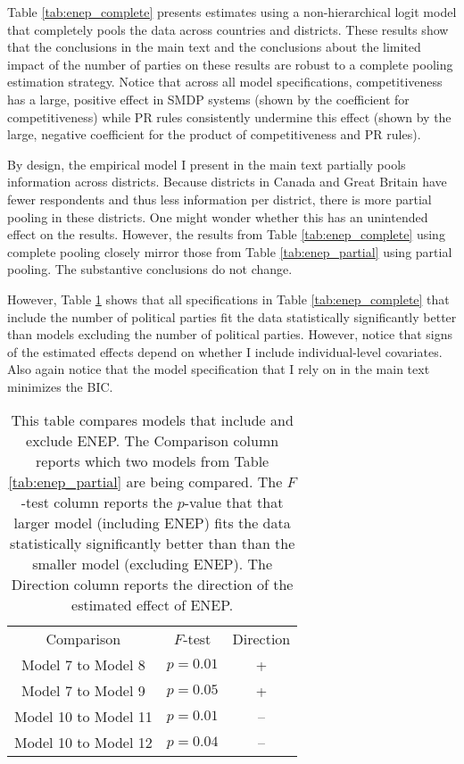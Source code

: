 \documentclass[12pt]{article}
\begin{document}
\begin{appendix}
Table \ref{tab:enep_complete} presents estimates using a non-hierarchical logit model that completely pools the data across countries and districts. These results show that the conclusions in the main text and the conclusions about the limited impact of the number of parties on these results are robust to a complete pooling estimation strategy. Notice that across all model specifications, competitiveness has a large, positive effect in SMDP systems (shown by the coefficient for competitiveness) while PR rules consistently undermine this effect (shown by the large, negative coefficient for the product of competitiveness and PR rules).

By design, the empirical model I present in the main text partially pools information across districts. Because districts in Canada and Great Britain have fewer respondents and thus less information per district, there is more partial pooling in these districts. One might wonder whether this has an unintended effect on the results. However, the results from Table \ref{tab:enep_complete} using complete pooling closely mirror those from Table \ref{tab:enep_partial} using partial pooling. The substantive conclusions do not change.

However, Table \ref{tab:F_complete} shows that all specifications in Table \ref{tab:enep_complete} that include the number of political parties  fit the data statistically significantly better than models excluding the number of political parties. However, notice that signs of the estimated effects depend on whether I include individual-level covariates. Also again notice that the model specification that I rely on in the main text minimizes the BIC.




 \begin{table}[h!]
 \begin{center}
 \begin{tabular}{c c c}
 Comparison & $F$-test & Direction \\
 Model 7 to Model 8 & $p = 0.01$ & + \\
 Model 7 to Model 9 & $p = 0.05$ & + \\
 Model 10 to Model 11 & $p = 0.01$ & -- \\
 Model 10 to Model 12 & $p = 0.04$ & -- \\
 \end{tabular} \caption{This table compares models that include and exclude ENEP. The Comparison column reports which two models from Table \ref{tab:enep_partial} are being compared. The $F$-test column reports the $p$-value that that larger model (including ENEP) fits the data statistically significantly better than than the smaller model (excluding ENEP). The Direction column reports the direction of the estimated effect of ENEP.}\label{tab:F_complete}
 \end{center}
 \end{table}


\end{appendix}
\end{document}
